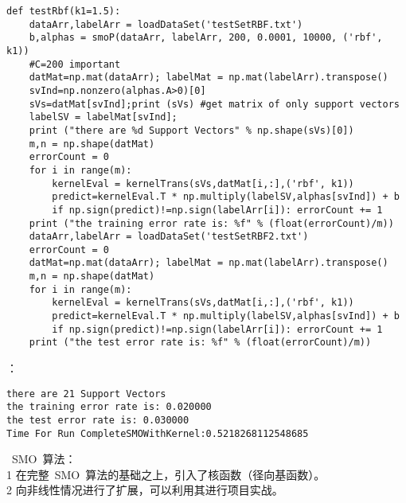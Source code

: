 \begin{lstlisting}
def testRbf(k1=1.5):
    dataArr,labelArr = loadDataSet('testSetRBF.txt')
    b,alphas = smoP(dataArr, labelArr, 200, 0.0001, 10000, ('rbf', k1))
    #C=200 important
    datMat=np.mat(dataArr); labelMat = np.mat(labelArr).transpose()
    svInd=np.nonzero(alphas.A>0)[0]
    sVs=datMat[svInd];print (sVs) #get matrix of only support vectors
    labelSV = labelMat[svInd];
    print ("there are %d Support Vectors" % np.shape(sVs)[0])
    m,n = np.shape(datMat)
    errorCount = 0
    for i in range(m):
        kernelEval = kernelTrans(sVs,datMat[i,:],('rbf', k1))
        predict=kernelEval.T * np.multiply(labelSV,alphas[svInd]) + b
        if np.sign(predict)!=np.sign(labelArr[i]): errorCount += 1
    print ("the training error rate is: %f" % (float(errorCount)/m))
    dataArr,labelArr = loadDataSet('testSetRBF2.txt')
    errorCount = 0
    datMat=np.mat(dataArr); labelMat = np.mat(labelArr).transpose()
    m,n = np.shape(datMat)
    for i in range(m):
        kernelEval = kernelTrans(sVs,datMat[i,:],('rbf', k1))
        predict=kernelEval.T * np.multiply(labelSV,alphas[svInd]) + b
        if np.sign(predict)!=np.sign(labelArr[i]): errorCount += 1
    print ("the test error rate is: %f" % (float(errorCount)/m))
\end{lstlisting}

：
\begin{lstlisting}
there are 21 Support Vectors
the training error rate is: 0.020000
the test error rate is: 0.030000
Time For Run CompleteSMOWithKernel:0.5218268112548685
\end{lstlisting}

~SMO~算法：\\
\textcircled{\footnotesize{1}} 在完整~SMO~算法的基础之上，引入了核函数（径向基函数）。         \\
\textcircled{\footnotesize{2}} 向非线性情况进行了扩展，可以利用其进行项目实战。         \\




